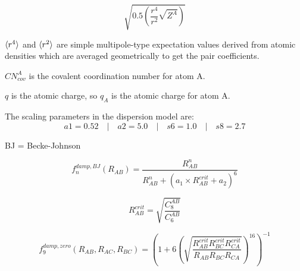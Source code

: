 \begin{equation}
  \sqrt{0.5 \left(\frac{r^4}{r^2} \sqrt{Z^A}\right)}
\end{equation}

\(\braket{r^4}\) and \(\braket{r^2}\) are simple multipole-type expectation values derived from atomic densities which are averaged geometrically to get the pair coefficients.

\vspace{20pt}
\noindent
\(CN^A_{cov}\) is the covalent coordination number for atom A.

\vspace{10pt}
\noindent
\(q\) is the atomic charge, so \(q_A\) is the atomic charge for atom A.

\vspace{10pt}
\noindent
The scaling parameters in the dispersion model are:
\[
  a1 = 0.52 \quad|\quad a2 = 5.0 \quad|\quad s6 = 1.0 \quad|\quad s8 = 2.7
\]

\vspace{10pt}
\noindent
BJ = Becke-Johnson

\begin{equation}
  f_n^{damp,BJ}(R_{AB}) = \frac{R_{AB}^n}{R_{AB}^n + (a_1 \times R_{AB}^{crit} + a_2)^6}
\end{equation}

\begin{equation}
  R_{AB}^{crit} = \sqrt{\frac{C_8^{AB}}{C_6^{AB}}}
\end{equation}


\begin{equation}
  f_9^{damp,zero}(R_{AB}, R_{AC}, R_{BC}) = \left(1 + 6 \left(\sqrt{\frac{R_{AB}^{crit} R_{BC}^{crit} R_{CA}^{crit}}{R_{AB} R_{BC} R_{CA}}}\right)^{16}\right)^{-1}
\end{equation}
